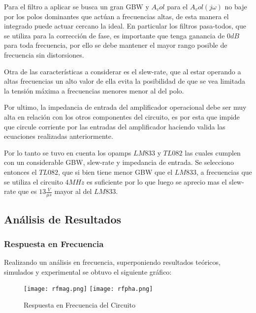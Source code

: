 Para el filtro a aplicar se busca un gran GBW y $A_vol$ para el $A_vol(j\omega)$ no baje por los polos dominantes que actúan a frecuencias altas, de esta manera el integrado puede actuar cercano la ideal. En particular los filtros pasa-todos, que se utiliza para la corrección de fase, es importante que tenga ganancia de $0dB$ para toda frecuencia, por ello se debe mantener el mayor rango posible de frecuencia sin distorsiones. 

Otra de las características a considerar es el slew-rate, que al estar operando a altas frecuencias un alto valor de ella evita la posibilidad de que se vea limitada la tensión máxima a frecuencias menores menor al del polo. 

Por ultimo, la impedancia de entrada del amplificador operacional debe ser muy alta en relación con los otros componentes del circuito, es por esta que impide que circule corriente por las entradas del amplificador haciendo valida las ecuaciones realizadas anteriormente. 

Por lo tanto se tuvo en cuenta los opamps $LM833$ y $TL082$ las cuales cumplen con un considerable GBW, slew-rate y impedancia de entrada. Se selecciono entonces el $TL082$, que si bien tiene menor GBW que el $LM833$, a frecuencias que se utiliza el circuito $4MHz$ es suficiente por lo que luego se aprecio mas el slew-rate que es $13\frac{V}{\mu s}$ mayor al del $LM833$. 

\subsection{Análisis de Resultados}

\subsubsection{Respuesta en Frecuencia}

Realizando un análisis en frecuencia, superponiendo resultados teóricos, simulados y experimental se obtuvo el siguiente gráfico:

\begin{figure}[H]
    \centering
    \texttt{[image: rfmag.png]}
    \texttt{[image: rfpha.png]}
    \caption{Respuesta en Frecuencia del Circuito}
    \label{ej1rf}
\end{figure}

